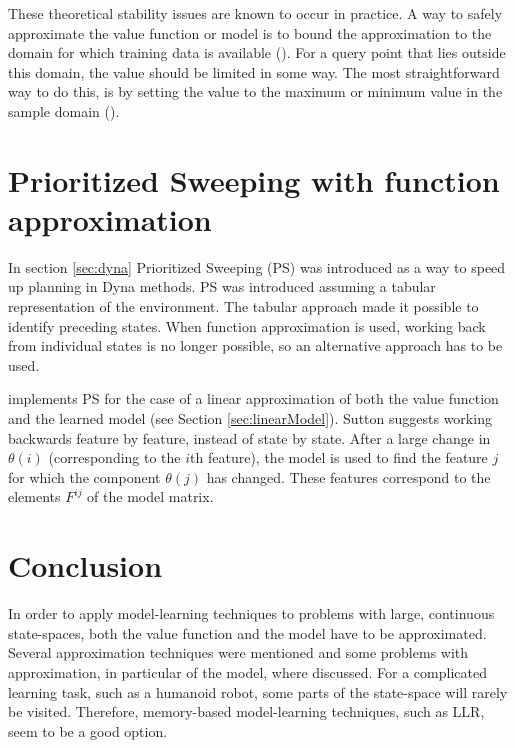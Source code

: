 \documentclass[a4paper,11pt]{mscLiterature}
\begin{document}
These theoretical stability issues are known to occur in practice. A way to safely approximate the value function or model is to bound the approximation to the domain for which training data is available (\cite{SmartKaelbling:00}). For a query point that lies outside this domain, the value should be limited in some way. The most straightforward way to do this, is by setting the value to the maximum or minimum value in the sample domain (\cite{Vaandrager:08}).



\section{Prioritized Sweeping with function approximation} \label{sec:PSwithFA}
In section \ref{sec:dyna} Prioritized Sweeping (PS) was introduced as a way to speed up planning in Dyna methods. PS was introduced assuming a tabular representation of the environment. The tabular approach made it possible to identify preceding states. When function approximation is used, working back from individual states is no longer possible, so an alternative approach has to be used.

\cite{Sutton:08} implements PS for the case of a linear approximation of both the value function and the learned model (see Section \ref{sec:linearModel}). Sutton suggests working backwards feature by feature, instead of state by state. After a large change in $\theta(i)$ (corresponding to the $i$th feature), the model is used to find the feature $j$ for which the component $\theta(j)$ has changed. These features correspond to the elements $F^{ij}$ of the model matrix.


\section{Conclusion}
In order to apply model-learning techniques to problems with large, continuous state-spaces, both the value function and the model have to be approximated. Several approximation techniques were mentioned and some problems with approximation, in particular of the model, where discussed. For a complicated learning task, such as a humanoid robot, some parts of the state-space will rarely be visited. Therefore, memory-based model-learning techniques, such as LLR, seem to be a good option.
\end{document}
